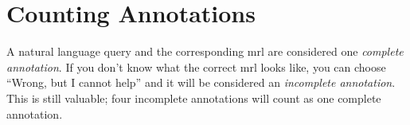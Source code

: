 \section{Counting Annotations}

A natural language query and the corresponding mrl are considered one
\emph{complete annotation}. If you don’t know what the correct mrl looks like,
you can choose \enquote{Wrong, but I cannot help} and it will be considered an
\emph{incomplete annotation}. This is still valuable; four incomplete
annotations will count as one complete annotation.

